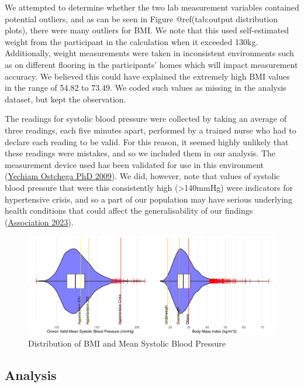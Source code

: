 \documentclass[
  11pt,
  twocolumn]{article}
\begin{document}
We attempted to determine whether the two lab measurement variables
contained potential outliers, and as can be seen in Figure
@ref(tab:output distribution plots), there were many outliers for BMI.
We note that this used self-estimated weight from the participant in the
calculation when it exceeded 130kg. Additionally, weight measurements
were taken in inconsistent environments such as on different flooring in
the participants' homes which will impact measurement accuracy. We
believed this could have explained the extremely high BMI values in the
range of 54.82 to 73.49. We coded such values as missing in the analysis
dataset, but kept the observation.

The readings for systolic blood pressure were collected by taking an
average of three readings, each five minutes apart, performed by a
trained nurse who had to declare each reading to be valid. For this
reason, it seemed highly unlikely that these readings were mistakes, and
so we included them in our analysis. The measurement device used has
been validated for use in this environment
(\protect\hyperlink{ref-Omron}{Yechiam Ostchega PhD 2009}). We did,
however, note that values of systolic blood pressure that were this
consistently high (\textgreater140mmHg) were indicators for hypertensive
crisis, and so a part of our population may have serious underlying
health conditions that could affect the generalisability of our findings
(\protect\hyperlink{ref-heart}{Association 2023}).

\begin{figure}[H]
\includegraphics{Coursework_files/figure-latex/output-distribution-plots-1} \caption{Distribution of BMI and Mean Systolic Blood Pressure}\label{fig:output-distribution-plots}
\end{figure}

\hypertarget{analysis}{%
\subsection{Analysis}\label{analysis}}
\end{document}
